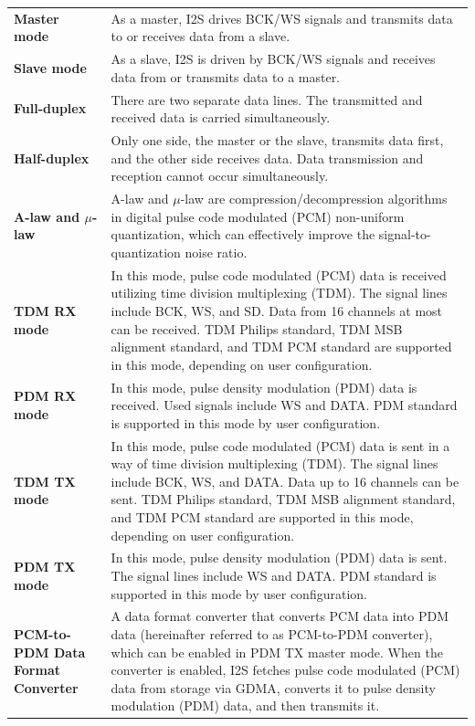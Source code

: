 \documentclass[main\_\_EN.tex]{subfiles}
\begin{document}
\begin{longtable}[c]{ R{6cm} p{10cm} }
\textbf{Master mode}     & As a master, I2S drives BCK/WS signals and transmits data to or receives data from a slave. \\ 
\textbf{Slave mode}      & As a slave, I2S is driven by BCK/WS signals and receives data from or transmits data to a master. \\
\textbf{Full-duplex} & There are two separate data lines. The transmitted and received data is carried simultaneously.\\
\textbf{Half-duplex} & Only one side, the master or the slave, transmits data first, and the other side receives data. Data transmission and reception cannot occur simultaneously.\\
\textbf{A-law and $\mu$-law} & A-law and \textrm{$\mu$}-law are compression/decompression algorithms in digital pulse code modulated (PCM) non-uniform quantization, which can effectively improve the signal-to-quantization noise ratio. \\
\textbf{TDM RX mode} & In this mode, pulse code modulated (PCM) data is received utilizing time division multiplexing (TDM). The signal lines include BCK, WS, and SD. Data from 16 channels at most can be received. TDM Philips standard, TDM MSB alignment standard, and TDM PCM standard are supported in this mode, depending on user configuration.\\
\textbf{PDM RX mode} & In this mode, pulse density modulation (PDM) data is received. Used signals include WS and DATA. PDM standard is supported in this mode by user configuration.\\
\textbf{TDM TX mode} & In this mode, pulse code modulated (PCM) data is sent in a way of time division multiplexing (TDM). The signal lines include BCK, WS, and DATA. Data up to 16 channels can be sent. TDM Philips standard, TDM MSB alignment standard, and TDM PCM standard are supported in this mode, depending on user configuration.\\
\textbf{PDM TX mode} & In this mode, pulse density modulation (PDM) data is sent. The signal lines include WS and DATA. PDM standard is supported in this mode by user configuration.\\
\textbf{PCM-to-PDM Data Format Converter} & A data format converter that converts PCM data into PDM data (hereinafter referred to as PCM-to-PDM converter), which can be enabled in PDM TX master mode. When the converter is enabled, I2S fetches pulse code modulated (PCM) data from storage via GDMA, converts it to pulse density modulation (PDM) data, and then transmits it.\\
\end{longtable}
\end{document}
